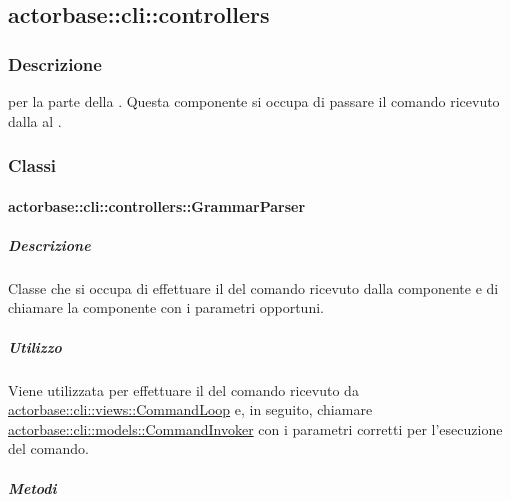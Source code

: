 \documentclass{scalatekids-article}
\begin{document}
\subsection{actorbase::cli::controllers}
\label{sec:actorbase::cli::controllers}


\subsubsection{Descrizione}

 per la parte  della . Questa
componente si occupa di passare il comando ricevuto dalla  al
.

\subsubsection{Classi}

\paragraph{actorbase::cli::controllers::GrammarParser}
\label{sec:actorbase::cli::controllers::GrammarParser}

\subparagraph{Descrizione}

Classe che si occupa di effettuare il  del comando ricevuto
dalla componente  e di chiamare la componente  con i
parametri opportuni.

\subparagraph{Utilizzo}

Viene utilizzata per effettuare il  del comando ricevuto da
\hyperref[sec:actorbase::cli::views::CommandLoop]{actorbase::cli::views::CommandLoop} e, in seguito, chiamare
\hyperref[sec:actorbase::cli::models::CommandInvoker]{actorbase::cli::models::CommandInvoker} con i parametri corretti per
l'esecuzione del comando.

\subparagraph{Metodi}
\end{document}
